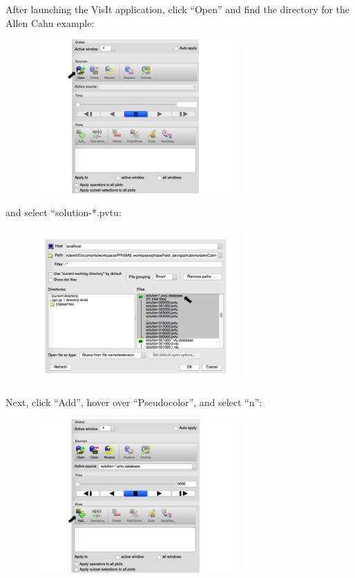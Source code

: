 \documentclass[10pt]{article} %
\begin{document}
After launching the VisIt application, click ``Open'' and find the directory for the Allen Cahn example:
\begin{figure}[H]
\vspace{0pt}
\centering
\includegraphics[width=0.7\textwidth]{visit_open.png}
\vspace{0pt}
\end{figure}
and select ``solution-*.pvtu:
\begin{figure}[H]
\vspace{0pt}
\centering
\includegraphics[width=0.7\textwidth]{visit_path.png}
\vspace{0pt}
\end{figure}
Next, click ``Add'', hover over ``Pseudocolor'', and select ``n'':
\begin{figure}[H]
\vspace{0pt}
\centering
\includegraphics[width=0.7\textwidth]{visit_add.png}
\vspace{0pt}
\end{figure}
\end{document}
